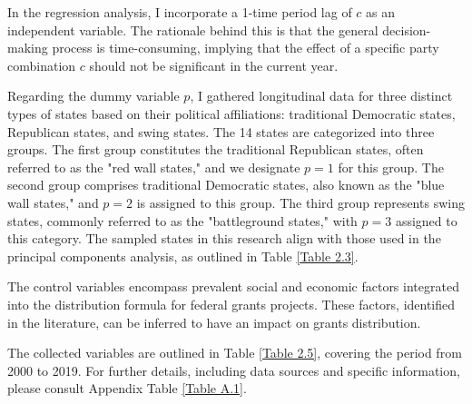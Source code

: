

In the regression analysis, I incorporate a 1-time period lag of $c$ as an independent variable. The rationale behind this is that the general decision-making process is time-consuming, implying that the effect of a specific party combination $c$ should not be significant in the current year.

Regarding the dummy variable $p$, I gathered longitudinal data for three distinct types of states based on their political affiliations: traditional Democratic states, Republican states, and swing states. The 14 states are categorized into three groups. The first group constitutes the traditional Republican states, often referred to as the "red wall states," and we designate $p = 1$ for this group. The second group comprises traditional Democratic states, also known as the "blue wall states," and $p = 2$ is assigned to this group. The third group represents swing states, commonly referred to as the "battleground states," with $p = 3$ assigned to this category. The sampled states in this research align with those used in the principal components analysis, as outlined in Table \ref{Table 2.3}.


The control variables encompass prevalent social and economic factors integrated into the distribution formula for federal grants projects. These factors, identified in the literature, can be inferred to have an impact on grants distribution.


The collected variables are outlined in Table \ref{Table 2.5}, covering the period from 2000 to 2019. For further details, including data sources and specific information, please consult Appendix Table \ref {Table A.1}.

